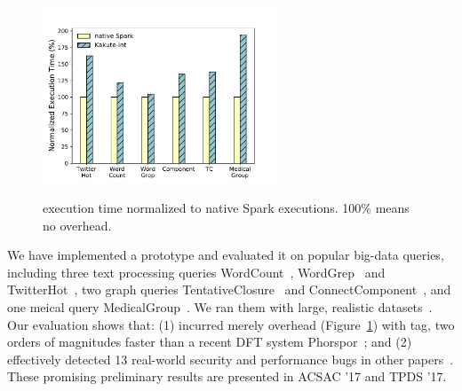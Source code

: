 \begin{figure}
  \vspace{-.1in}
  \includegraphics[width=7cm]{figures/time_overhead.pdf}\\
  \vspace{-.3in}
  \caption{\kakute execution time normalized to native Spark executions. 100\% 
means no overhead.}
  \label{fig:scalability}
\end{figure}

 We have implemented a \kakute prototype 
and evaluated it on \appeval popular big-data queries, including three text 
processing queries WordCount~\cite{spark:example}, 
WordGrep~\cite{newt:socc13} and TwitterHot~\cite{spark:example}, two graph 
queries TentativeClosure~\cite{spark:example}
and ConnectComponent~\cite{spark:example}, and one meical query
MedicalGroup~\cite{pigmix}.
We ran them with large, realistic datasets~\cite{vldb16:output, 
icse16:bigdebug, vldb15:titian}.
Our evaluation shows that: (1) \kakute 
incurred merely \timeavg overhead (Figure~\ref{fig:scalability}) with 
 tag, two orders of magnitudes faster than a recent DFT 
system Phorspor~\cite{oo14:phosphor}; and (2) \kakute effectively 
detected 13 real-world security and performance bugs in other 
papers~\cite{arthur:dave2013,icse16:bigdebug,airavat:nsdi10}. These promising 
preliminary results are presented in ACSAC '17 and TPDS '17.














